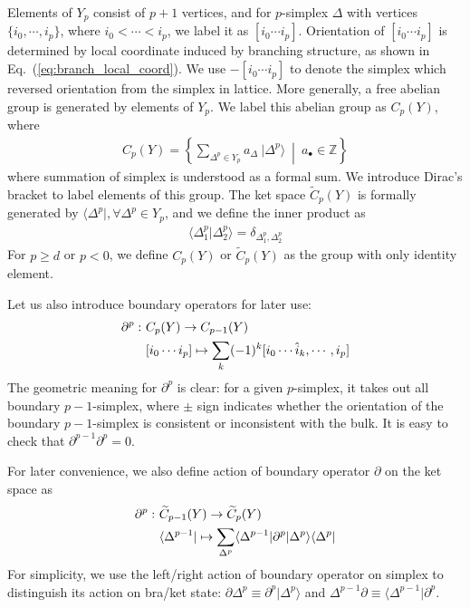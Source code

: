 \documentclass[reprint,amsmath,amssymb,aps,pra,]{revtex4-1}
\begin{document}
Elements of $Y_p$ consist of $p+1$ vertices, and for $p$-simplex $\Delta$ with vertices $\{i_0,\cdots,i_{p}\}$, where $i_0<\cdots<i_{p}$, we label it as $[i_0\cdots i_{p}]$.
Orientation of $[i_0\cdots i_{p}]$ is determined by local coordinate induced by branching structure, as shown in Eq.~(\ref{eq:branch_local_coord}).
We use $-[i_0 \cdots i_{p}]$ to denote the simplex which reversed orientation from the simplex in lattice.
More generally, a free abelian group is generated by elements of $Y_p$.
We label this abelian group as $C_p(Y)$, where
\begin{align}
  C_p(Y)=\left\{\sum_{\Delta^p\in Y_p}a_{\Delta}~|\Delta^p\rangle~\middle|~a_\bullet\in\mathbb{Z}\right\}
  \label{}
\end{align}
where summation of simplex is understood as a formal sum. 
We introduce Dirac's bracket to label elements of this group.
The ket space $\widetilde{C}_p(Y)$ is formally generated by $\langle\Delta^p|, \forall \Delta^p\in Y_p$, and we define the inner product as
\begin{align}
  \langle \Delta^p_1|\Delta^p_2\rangle=\delta_{\Delta^p_1,\Delta^p_2}
  \label{eq:simplex_inner_prod}
\end{align}
For $p\ge d$ or $p<0$, we define $C_p(Y)$ or $\widetilde{C}_p(Y)$ as the group with only identity element.

Let us also introduce boundary operators for later use:
\begin{align}
  \partial^{p}:~&C_p(Y)\rightarrow C_{p-1}(Y)\notag\\
  &[i_0 \cdots i_{p}]\mapsto\sum_{k}(-1)^k[i_0 \cdots \hat{i}_k,\cdots,i_{p}]
  \label{eq:simplicial_homology_bdry_operator}
\end{align}
The geometric meaning for $\partial^p$ is clear: for a given $p$-simplex, it takes out all boundary $p-1$-simplex, where $\pm$ sign indicates whether the orientation of the boundary $p-1$-simplex is consistent or inconsistent with the bulk.
It is easy to check that $\partial^{p-1}\partial^{p}=0$.

For later convenience, we also define action of boundary operator $\partial$ on the ket space as
\begin{align}
  \partial^{p}:~&\widetilde{C}_{p-1}(Y)\rightarrow \widetilde{C}_{p}(Y)\notag\\
  &\langle\Delta^{p-1}|\mapsto\sum_{\Delta^p}\langle\Delta^{p-1}|\partial^p|\Delta^p\rangle\langle\Delta^p|
  \label{eq:ket_bdry_operator}
\end{align}
For simplicity, we use the left/right action of boundary operator on simplex to distinguish its action on bra/ket state: $\partial\Delta^p\equiv\partial^p|\Delta^p\rangle$ and $\Delta^{p-1}\partial\equiv\langle\Delta^{p-1}|\partial^p$.
\end{document}
